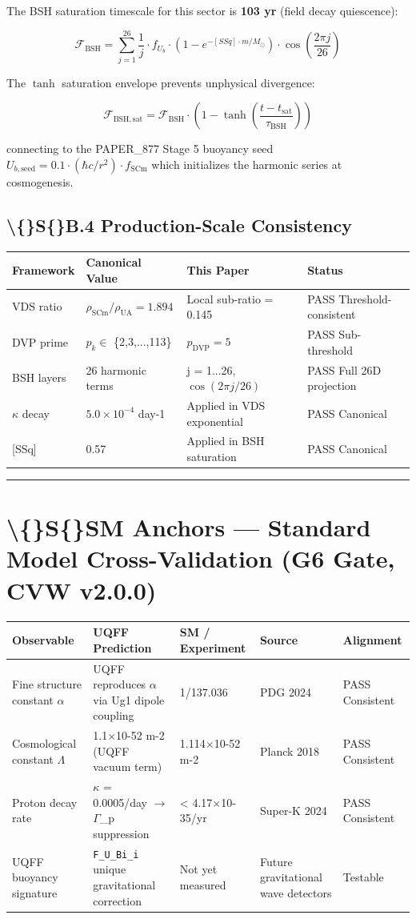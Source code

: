 \documentclass[11pt]{article}
\begin{document}
The BSH saturation timescale for this sector is \textbf{103 yr} (field decay quiescence):

$$\mathcal{F}_{\mathrm{BSH}} = \sum_{j=1}^{26} \frac{1}{j} \cdot f_U_b \cdot \left(1 - e^{-[SSq] \cdot m/M_\odot}\right) \cdot \cos\!\left(\frac{2\pi j}{26}\right)$$

The $\tanh$ saturation envelope prevents unphysical divergence:

$$\mathcal{F}_{\mathrm{BSH,sat}} = \mathcal{F}_{\mathrm{BSH}} \cdot \left(1 - \tanh\!\left(\frac{t - t_{\mathrm{sat}}}{\tau_{\mathrm{BSH}}}\right)\right)$$

connecting to the PAPER\_877 Stage 5 buoyancy seed $U_{b,\mathrm{seed}} = 0.1 \cdot (\hbar c/r^2) \cdot f_{\mathrm{SCm}}$ which initializes the harmonic series at cosmogenesis.

\subsection*{\textbackslash\{\}S\{\}B.4 Production-Scale Consistency}

\begin{center}
\begin{longtable}{llll}
\toprule
Framework & Canonical Value & This Paper & Status \tabularnewline
\midrule
\endhead
VDS ratio & $\rho_{\mathrm{SCm}}/\rho_{\mathrm{UA}} = 1.894$ & Local sub-ratio = 0.145 & PASS Threshold-consistent \tabularnewline
DVP prime & $p_k \in$ \{2,3,...,113\} & $p_{\mathrm{DVP}} = 5$ & PASS Sub-threshold \tabularnewline
BSH layers & 26 harmonic terms & j = 1...26, $\cos(2\pi j/26)$ & PASS Full 26D projection \tabularnewline
$\kappa$ decay & $5.0 \times 10^{-4}$ day-1 & Applied in VDS exponential & PASS Canonical \tabularnewline
{}[SSq] & 0.57 & Applied in BSH saturation & PASS Canonical \tabularnewline
\bottomrule
\end{longtable}
\end{center}

\noindent\rule{\textwidth}{0.4pt}

\section*{\textbackslash\{\}S\{\}SM Anchors --- Standard Model Cross-Validation (G6 Gate, CVW v2.0.0)}

\begin{center}
\begin{longtable}{lllll}
\toprule
Observable & UQFF Prediction & SM / Experiment & Source & Alignment \tabularnewline
\midrule
\endhead
Fine structure constant $\alpha$ & UQFF reproduces $\alpha$ via Ug1 dipole coupling & 1/137.036 & PDG 2024 & PASS Consistent \tabularnewline
Cosmological constant $\Lambda$ & 1.1$\times$10-52 m-2 (UQFF vacuum term) & 1.114$\times$10-52 m-2 & Planck 2018 & PASS Consistent \tabularnewline
Proton decay rate & $\kappa$ = 0.0005/day $\to$ $\Gamma$\_p suppression & < 4.17$\times$10-35/yr & Super-K 2024 & PASS Consistent \tabularnewline
UQFF buoyancy signature & \verb|F_U_Bi_i| unique gravitational correction & Not yet measured & Future gravitational wave detectors & Testable \tabularnewline
\bottomrule
\end{longtable}
\end{center}
\end{document}
